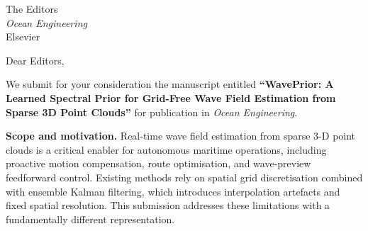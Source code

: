 \documentclass[11pt, a4paper]{letter}
\begin{document}
\begin{letter}{%
The Editors\\
\textit{Ocean Engineering}\\
Elsevier
}

\opening{Dear Editors,}

We submit for your consideration the manuscript entitled
\textbf{``WavePrior: A Learned Spectral Prior for Grid-Free Wave Field Estimation from Sparse 3D Point Clouds''} for publication in \textit{Ocean Engineering}.

\textbf{Scope and motivation.}
Real-time wave field estimation from sparse 3-D point clouds is a critical
enabler for autonomous maritime operations, including proactive motion
compensation, route optimisation, and wave-preview feedforward control.
Existing methods rely on spatial grid discretisation combined with ensemble
Kalman filtering, which introduces interpolation artefacts and fixed spatial
resolution.
This submission addresses these limitations with a fundamentally different
representation.


\end{letter}
\end{document}
